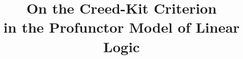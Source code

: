 \documentclass[conference]{IEEEtran}
\theoremstyle{plain}
\theoremstyle{definition}
\theoremstyle{remark}
\begin{document}

\title{On the Creed-Kit Criterion \\ in the Profunctor Model of Linear Logic}


\maketitle
\end{document}
